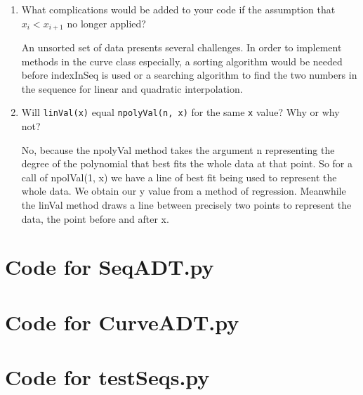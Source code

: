 \documentclass[12pt]{article}
\begin{document}
\begin{enumerate}
\item What complications would be added to your code if the assumption that
  $x_i < x_{i+1}$ no longer applied?

An unsorted set of data presents several challenges. In order to implement methods in the curve class especially, a sorting algorithm would be needed before indexInSeq is used or a searching algorithm to find the two numbers in the sequence for linear and quadratic interpolation.

\item Will \texttt{linVal(x)} equal \texttt{npolyVal(n, x)} for the same \texttt{x}
  value?  Why or why not?

No, because the npolyVal method takes the argument n representing the degree of the polynomial that best fits the whole data at that point. So for a call of npolVal(1, x) we have a line of best fit being used to represent the whole data. We obtain our y value from a method of regression. Meanwhile the linVal method draws a line between precisely two points to represent the data, the point before and after x.

\end{enumerate}

\newpage

\lstset{language=Python, basicstyle=\tiny, breaklines=true, showspaces=false,
  showstringspaces=false, breakatwhitespace=true}

\def\thesection{\Alph{section}} 

\section{Code for SeqADT.py}

\noindent 

\newpage

\section{Code for CurveADT.py}

\noindent 

\newpage

\section{Code for testSeqs.py}

\noindent 
\end{document}
